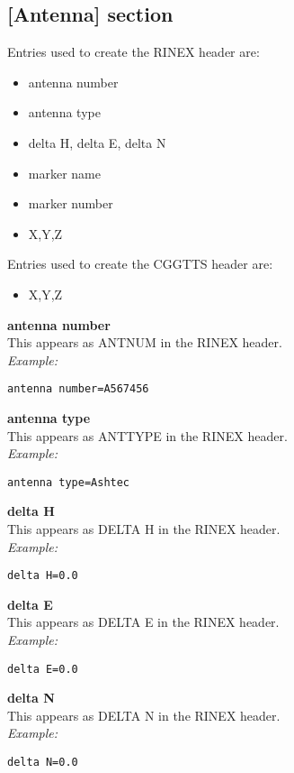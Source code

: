 \subsection{[Antenna] section}

Entries used to create the RINEX header are:
\begin{itemize}
\item antenna number
\item antenna type
\item delta H, delta E, delta N
\item marker name
\item marker number
\item X,Y,Z
\end{itemize}

Entries used to create the CGGTTS header are:
\begin{itemize}
\item X,Y,Z
\end{itemize}

\hypertarget{h:antenna}{}
{\bfseries antenna number}\\
This appears as ANTNUM in the RINEX header.\\
\textit{Example:}
\begin{lstlisting}
antenna number=A567456
\end{lstlisting}

{\bfseries antenna type}\\
This appears as ANTTYPE in the RINEX header.\\
\textit{Example:}
\begin{lstlisting}
antenna type=Ashtec
\end{lstlisting}

{\bfseries delta H}\\
This appears as DELTA H in the RINEX header.\\
\textit{Example:}
\begin{lstlisting}
delta H=0.0
\end{lstlisting}

{\bfseries delta E}\\
This appears as DELTA E in the RINEX header.\\
\textit{Example:}
\begin{lstlisting}
delta E=0.0
\end{lstlisting}

{\bfseries delta N}\\
This appears as DELTA N in the RINEX header.\\
\textit{Example:}
\begin{lstlisting}
delta N=0.0
\end{lstlisting}

